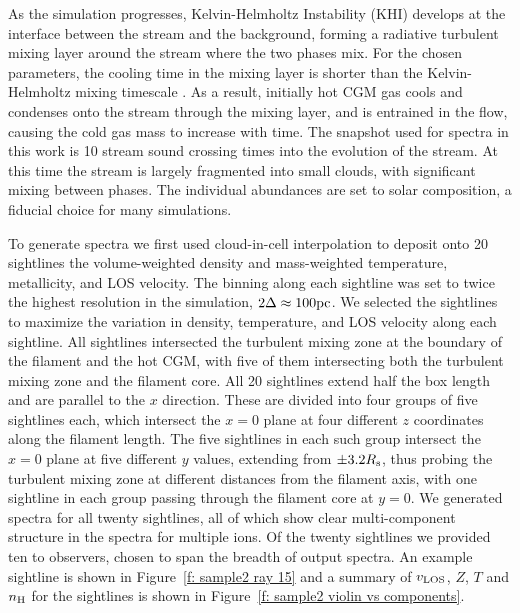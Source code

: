 \documentclass[fleqn,usenatbib]{mnras}
\begin{document}
As the simulation progresses, Kelvin-Helmholtz Instability (KHI) develops at the interface between the stream and the background, forming a radiative turbulent mixing layer around the stream where the two phases mix.
For the chosen parameters, the cooling time in the mixing layer is shorter than the Kelvin-Helmholtz mixing timescale \citep{mandelker2020Instability}.
As a result, initially hot CGM gas cools and condenses onto the stream through the mixing layer, and is entrained in the flow, causing the cold gas mass to increase with time.
The snapshot used for spectra in this work is 10 stream sound crossing times into the evolution of the stream.
At this time the stream is largely fragmented into small clouds, with significant mixing between phases.
The individual abundances are set to solar composition,
a fiducial choice for many simulations.

To generate spectra we first used cloud-in-cell interpolation to deposit onto 20 sightlines the volume-weighted density and mass-weighted temperature, metallicity, and LOS velocity.
The binning along each sightline was set to twice the highest resolution in the simulation, $2\Delta \approx 100{\rm pc}$.
We selected the sightlines to maximize the variation in density, temperature, and LOS velocity along each sightline.
All sightlines intersected the turbulent mixing zone at the boundary of the filament and the hot CGM, with five of them intersecting both the turbulent mixing zone and the filament core.
All 20 sightlines extend half the box length and are parallel to the $x$ direction.
These are divided into four groups of five sightlines each, which intersect the $x=0$ plane at four different $z$ coordinates along the filament length.
The five sightlines in each such group intersect the $x=0$ plane at five different $y$ values, extending from $\pm 3.2R_{\rm s}$, thus probing the turbulent mixing zone at different distances from the filament axis, with one sightline in each group passing through the filament core at $y=0$.
We generated spectra for all twenty sightlines, all of which show clear multi-component structure in the spectra for multiple ions.
Of the twenty sightlines we provided ten to observers, chosen to span the breadth of output spectra.
An example sightline is shown in Figure~\ref{f: sample2 ray 15} and a summary of $v_{\rm LOS}$, $Z$, $T$ and $n_{\rm H}$ for the sightlines is shown in Figure~\ref{f: sample2 violin vs components}.
\end{document}
